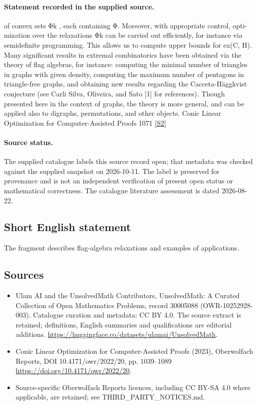 \documentclass[11pt]{article}
\newcommand{\sref}[2]{\hyperlink{source:#1:#2}{[S#2]}}
\begin{document}
\paragraph{Statement recorded in the supplied source.}
of convex sets Φk , each containing Φ. Moreover, with appropriate control, opti- mization over the relaxations Φk can be carried out efficiently, for instance via semidefinite programming. This allows us to compute upper bounds for ex(C, H). Many significant results in extremal combinatorics have been obtained via the theory of flag algebras, for instance: computing the minimal number of triangles in graphs with given density, computing the maximum number of pentagons in triangle-free graphs, and obtaining new results regarding the Cacceta-Häggkvist conjecture (see Carli Silva, Oliveira, and Sato [1] for references). Though presented here in the context of graphs, the theory is more general, and can be applied also to digraphs, permutations, and other objects. Conic Linear Optimization for Computer-Assisted Proofs 1071 \sref{30005088}{2}
\paragraph{Source status.}
The supplied catalogue labels this source record open; that metadata was checked against the supplied snapshot on 2026-10-11. The label is preserved for provenance and is not an independent verification of present open status or mathematical correctness. The catalogue literature assessment is dated 2026-08-22.
\subsection{Short English statement}
The fragment describes flag-algebra relaxations and examples of applications.
\subsection{Sources}
\begin{itemize}
\item[\hypertarget{source:30005088:1}{S1}] Ulam AI and the UnsolvedMath Contributors, UnsolvedMath: A Curated Collection of Open Mathematics Problems, record 30005088 (OWR-10252928-003). Catalogue curation and metadata: CC BY 4.0. The source extract is retained; definitions, English summaries and qualifications are editorial additions.
\url{https://huggingface.co/datasets/ulamai/UnsolvedMath}.
\item[\hypertarget{source:30005088:2}{S2}] Conic Linear Optimization for Computer-Assisted Proofs (2023), Oberwolfach Reports, DOI 10.4171/owr/2022/20, pp. 1039--1089
\url{https://doi.org/10.4171/owr/2022/20}.
\item Source-specific Oberwolfach Reports licences, including CC BY-SA 4.0 where applicable, are retained; see THIRD\_PARTY\_NOTICES.md.
\end{itemize}
\end{document}
